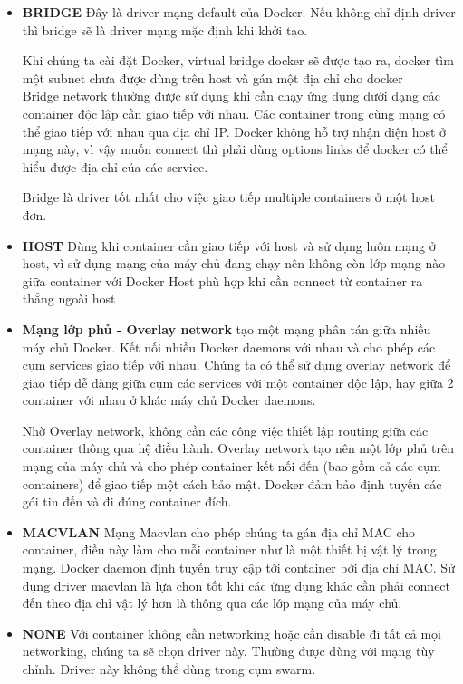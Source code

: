 \documentclass[a4paper,12pt]{article}
\begin{document}
\begin{itemize}
    \item \textbf{BRIDGE}
Đây là driver mạng default của Docker. Nếu không chỉ định driver thì bridge sẽ là driver mạng mặc định khi khởi tạo.

Khi chúng ta cài đặt Docker, virtual bridge docker sẽ được tạo ra, docker tìm một subnet chưa được dùng trên host và gán một địa chỉ cho docker\\

Bridge network thường được sử dụng khi cần chạy ứng dụng dưới dạng các container độc lập cần giao tiếp với nhau. Các container trong cùng mạng có thể giao tiếp với nhau qua địa chỉ IP. Docker không hỗ trợ nhận diện host ở mạng này, vì vậy muốn connect thì phải dùng options links để docker có thể hiểu được địa chỉ của các service.

Bridge là driver tốt nhất cho việc giao tiếp multiple containers ở một host đơn.
\item \textbf{HOST}
Dùng khi container cần giao tiếp với host và sử dụng luôn mạng ở host, vì sử dụng mạng của máy chủ đang chạy nên không còn lớp mạng nào giữa container với Docker Host phù hợp khi cần connect từ container ra thẳng ngoài host
\item \textbf{Mạng lớp phủ - Overlay network} 
tạo một mạng phân tán giữa nhiều máy chủ Docker. Kết nối nhiều Docker daemons với nhau và cho phép các cụm services giao tiếp với nhau. Chúng ta có thể sử dụng overlay network để giao tiếp dễ dàng giữa cụm các services với một container độc lập, hay giữa 2 container với nhau ở khác máy chủ Docker daemons.

Nhờ Overlay network, không cần các công việc thiết lập routing giữa các container thông qua hệ điều hành. Overlay network tạo nên một lớp phủ trên mạng của máy chủ và cho phép container kết nối đến (bao gồm cả các cụm containers) để giao tiếp một cách bảo mật. Docker đảm bảo định tuyến các gói tin đến và đi đúng container đích.
\item \textbf{MACVLAN}
Mạng Macvlan cho phép chúng ta gán địa chỉ MAC cho container, điều này làm cho mỗi container như là một thiết bị vật lý trong mạng. Docker daemon định tuyến truy cập tới container bởi địa chỉ MAC. Sử dụng driver macvlan là lựa chon tốt khi các ứng dụng khác cần phải connect đến theo địa chỉ vật lý hơn là thông qua các lớp mạng của máy chủ.
\item \textbf{NONE}
Với container không cần networking hoặc cần disable đi tất cả mọi networking, chúng ta sẽ chọn driver này. Thường được dùng với mạng tùy chỉnh. Driver này không thể dùng trong cụm swarm.
\end{itemize}
\end{document}
